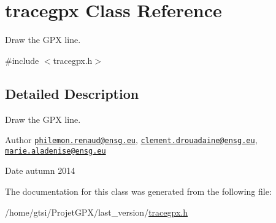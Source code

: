 \hypertarget{classtracegpx}{\section{tracegpx Class Reference}
\label{classtracegpx}
}


Draw the G\+P\+X line.  




{\ttfamily \#include $<$tracegpx.\+h$>$}



\subsection{Detailed Description}
Draw the G\+P\+X line. 

\begin{DoxyAuthor}{Author}
\href{mailto:philemon.renaud@ensg.eu}{\tt philemon.\+renaud@ensg.\+eu}, \href{mailto:clement.drouadaine@ensg.eu}{\tt clement.\+drouadaine@ensg.\+eu}, \href{mailto:marie.aladenise@ensg.eu}{\tt marie.\+aladenise@ensg.\+eu} 
\end{DoxyAuthor}
\begin{DoxyDate}{Date}
autumn 2014 
\end{DoxyDate}


The documentation for this class was generated from the following file\+:\begin{DoxyCompactItemize}
\item 
/home/gtsi/\+Projet\+G\+P\+X/last\+\_\+version/\hyperlink{tracegpx_8h}{tracegpx.\+h}\end{DoxyCompactItemize}
